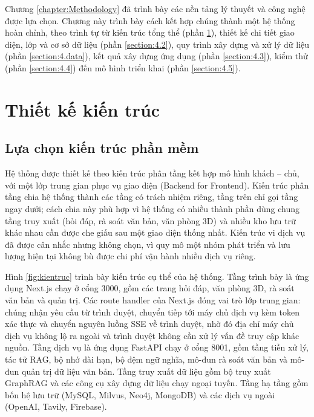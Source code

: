 \documentclass[../DoAn.tex]{subfiles}
\begin{document}
Chương \ref{chapter:Methodology} đã trình bày các nền tảng lý thuyết và công nghệ được lựa chọn. Chương này trình bày cách kết hợp chúng thành một hệ thống hoàn chỉnh, theo trình tự từ kiến trúc tổng thể (phần \ref{section:4.1}), thiết kế chi tiết giao diện, lớp và cơ sở dữ liệu (phần \ref{section:4.2}), quy trình xây dựng và xử lý dữ liệu (phần \ref{section:4.data}), kết quả xây dựng ứng dụng (phần \ref{section:4.3}), kiểm thử (phần \ref{section:4.4}) đến mô hình triển khai (phần \ref{section:4.5}).

\section{Thiết kế kiến trúc}
\label{section:4.1}

\subsection{Lựa chọn kiến trúc phần mềm}
Hệ thống được thiết kế theo kiến trúc phân tầng kết hợp mô hình khách -- chủ, với một lớp trung gian phục vụ giao diện (Backend for Frontend). Kiến trúc phân tầng chia hệ thống thành các tầng có trách nhiệm riêng, tầng trên chỉ gọi tầng ngay dưới; cách chia này phù hợp vì hệ thống có nhiều thành phần dùng chung tầng truy xuất (hỏi đáp, rà soát văn bản, văn phòng 3D) và nhiều kho lưu trữ khác nhau cần được che giấu sau một giao diện thống nhất. Kiến trúc vi dịch vụ đã được cân nhắc nhưng không chọn, vì quy mô một nhóm phát triển và lưu lượng hiện tại không bù được chi phí vận hành nhiều dịch vụ riêng.

Hình \ref{fig:kientruc} trình bày kiến trúc cụ thể của hệ thống. Tầng trình bày là ứng dụng Next.js chạy ở cổng 3000, gồm các trang hỏi đáp, văn phòng 3D, rà soát văn bản và quản trị. Các route handler của Next.js đóng vai trò lớp trung gian: chúng nhận yêu cầu từ trình duyệt, chuyển tiếp tới máy chủ dịch vụ kèm token xác thực và chuyển nguyên luồng SSE về trình duyệt, nhờ đó địa chỉ máy chủ dịch vụ không lộ ra ngoài và trình duyệt không cần xử lý vấn đề truy cập khác nguồn. Tầng dịch vụ là ứng dụng FastAPI chạy ở cổng 8001, gồm tầng tiền xử lý, tác tử RAG, bộ nhớ dài hạn, bộ đệm ngữ nghĩa, mô-đun rà soát văn bản và mô-đun quản trị dữ liệu văn bản. Tầng truy xuất dữ liệu gồm bộ truy xuất GraphRAG và các công cụ xây dựng dữ liệu chạy ngoại tuyến. Tầng hạ tầng gồm bốn hệ lưu trữ (MySQL, Milvus, Neo4j, MongoDB) và các dịch vụ ngoài (OpenAI, Tavily, Firebase).

\end{document}
